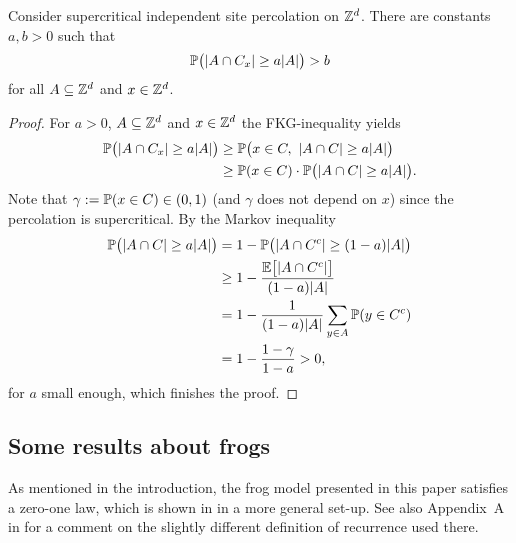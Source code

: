 \begin{lemma}\label{percolation_density}
Consider supercritical independent site percolation on $\Z^d$. There are constants $a,b>0$ such that 
\begin{equation*}
\P\bigl(\lvert A \cap C_x \rvert \geq a \lvert A \rvert \bigr) > b
\end{equation*}
for all $A \subseteq \Z^d$ and $x \in \Z^d$.
\end{lemma}

\begin{proof}
 
For $a>0$, $A \subseteq \Z^d$ and $x \in \Z^d$ the FKG-inequality yields
\begin{align*}
\P\bigl(\lvert A \cap C_x \rvert \geq a \lvert A \rvert \bigr)
& \geq \P\bigl( x \in C, \ \lvert A \cap C \rvert \geq a \lvert A \rvert \bigr)\\
& \geq \P( x \in C) \cdot \P\bigl(\lvert A \cap C \rvert \geq a \lvert A \rvert \bigr).
\end{align*}
Note that $\gamma:=\P( x \in C) \in (0,1)$ (and $\gamma$ does not depend on $x$) since the percolation is supercritical. By the Markov inequality
\begin{align*}
\P\bigl(\lvert A \cap C \rvert \geq a \lvert A \rvert \bigr)
& = 1 - \P\bigl(\lvert A \cap C^c \rvert \geq (1-a) \lvert A \rvert \bigr)\\
& \geq 1- \frac{\E \bigl[\lvert A \cap C^c \rvert \bigr] }{(1-a) \lvert A \rvert}\\
& = 1- \frac{1}{(1-a) \lvert A \rvert} \sum_{y \in A} \P(y \in C^c) \\
& = 1- \frac{1-\gamma}{1-a}>0,
\end{align*}
for $a$ small enough, which finishes the proof.
\end{proof}




\subsection*{Some results about frogs}

As mentioned in the introduction, the frog model presented in this paper satisfies a zero-one law, which is shown in \cite[Theorem~1]{KZ17} in a more general set-up. See also Appendix~A in \cite{KZ17} for a comment on the slightly different definition of recurrence used there.

